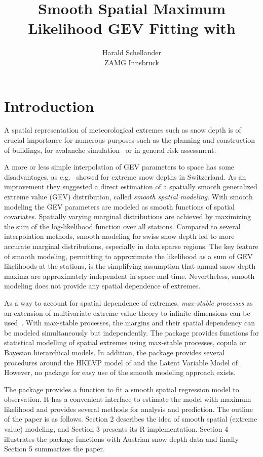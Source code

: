 \documentclass[a4paper,nojss]{jss}
\title{Smooth Spatial Maximum Likelihood GEV Fitting with \pkg{gevreg}}
\author{Harald Schellander\\ZAMG Innsbruck}
\newcommand{\CRANpkg}[1]{\href{http://CRAN.R-project.org/package=#1}{\pkg{#1}}}%
\begin{document}


\section{Introduction}
\label{sec:intro}
A spatial representation of meteorological extremes such as snow depth is of crucial importance for numerous purposes such as the planning and construction of buildings, for avalanche simulation~\citep{HandbuchTechnischerLawinenschutz2011} or in general risk assessment. 

A more or less simple interpolation of GEV parameters to space has some disadvantages, as e.g.~\cite{BlanchetLehning2010} showed for extreme snow depths in Switzerland. As an improvement they suggested a direct estimation of a spatially smooth generalized extreme value (GEV) distribution, called \emph{smooth spatial modeling}. With smooth modeling the GEV parameters are modeled as smooth functions of spatial covariates. Spatially varying marginal distributions are achieved by maximizing the sum of the log-likelihood function over all stations. Compared to several interpolation methods, smooth modeling for swiss snow depth led to more accurate marginal distributions, especially in data sparse regions. The key feature of smooth modeling, permitting to approximate the likelihood as a sum of GEV likelihoods at the stations, is the simplifying assumption that annual snow depth maxima are approximately independent in space and time. Nevertheless, smooth modeling does not provide any spatial dependence of extremes. 

As a way to account for spatial dependence of extremes, \emph{max-stable processes} as an extension of multivariate extreme value theory to infinite dimensions can be used~\citep{Haan1984}. With max-stable processes, the margins and their spatial dependency can be modeled simultaneously but independently. The \CRANpkg{SpatialExtremes} package provides functions for statistical modelling of spatial extremes using max-stable processes, copula or Bayesian hierarchical models. In addition, the \CRANpkg{hkevp} package provides several procedures around the HKEVP model of \cite{Reich2012} and the Latent Variable Model of \cite{DavisonRibatetPadoan2012}. However, no package for easy use of the smooth modeling approach exists. 

The  package provides a function to fit a smooth spatial regression model to observation. It has a convenient interface to estimate the model with maximum likelihood and provides several methods for analysis and prediction. 
The outline of the paper is as follows. Section 2 describes the idea of smooth spatial (extreme value) modeling, and Section 3 presents its R implementation. Section 4 illustrates the package
functions with Austrian snow depth data and finally Section 5 summarizes the paper.
\end{document}
